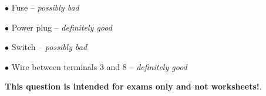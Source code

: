 
\medskip
\item{$\bullet$} Fuse -- {\it possibly bad}
\item{$\bullet$} Power plug -- {\it definitely good}
\item{$\bullet$} Switch -- {\it possibly bad}
\item{$\bullet$} Wire between terminals 3 and 8 -- {\it definitely good}
\medskip







{\bf This question is intended for exams only and not worksheets!}.



